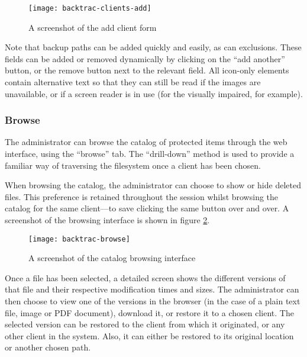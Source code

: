 \begin{figure}
    \begin{center}
        \texttt{[image: backtrac-clients-add]}
    \end{center}
    \caption{A screenshot of the add client form}
    \label{fig:backtrac-clients-add}
\end{figure}

Note that backup paths can be added quickly and easily, as can exclusions.
These fields can be added or removed dynamically by clicking on the ``add
another'' button, or the remove button next to the relevant field. All
icon-only elements contain alternative text so that they can still be read if
the images are unavailable, or if a screen reader is in use (for the visually
impaired, for example).

\subsubsection{Browse}
\label{sec:implementation-web-browse}

The administrator can browse the catalog of protected items through the web
interface, using the ``browse'' tab. The ``drill-down'' method is used to
provide a familiar way of traversing the filesystem once a client has been
chosen.

When browsing the catalog, the administrator can choose to show or hide deleted
files. This preference is retained throughout the session whilst browsing the
catalog for the same client---to save clicking the same button over and over.
A screenshot of the browsing interface is shown in figure
\ref{fig:backtrac-browse}.

\begin{figure}
    \begin{center}
        \texttt{[image: backtrac-browse]}
    \end{center}
    \caption{A screenshot of the catalog browsing interface}
    \label{fig:backtrac-browse}
\end{figure}

Once a file has been selected, a detailed screen shows the different versions
of that file and their respective modification times and sizes. The
administrator can then choose to view one of the versions in the browser (in
the case of a plain text file, image or PDF document), download it, or restore
it to a chosen client. The selected version can be restored to the client from
which it originated, or any other client in the system. Also, it can either be
restored to its original location or another chosen path.

